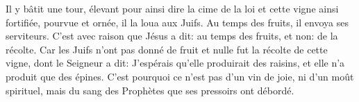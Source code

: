 Il y bâtit une tour, élevant pour ainsi dire la cime de la loi
	et cette vigne ainsi fortifiée, pourvue et ornée, il la loua aux Juifs.
Au temps des fruits, il envoya ses serviteurs.
	C’est avec raison que Jésus a dit:
	au temps des fruits, et non: de la récolte.
Car les Juifs n’ont pas donné de fruit et nulle fut la récolte de cette vigne,
	dont le Seigneur a dit:
	J’espérais qu’elle produirait des raisins,
		et elle n’a produit que des épines.
C’est pourquoi ce n’est pas d’un vin de joie, ni d’un moût spirituel,
	mais du sang des Prophètes que ses pressoirs ont débordé.
